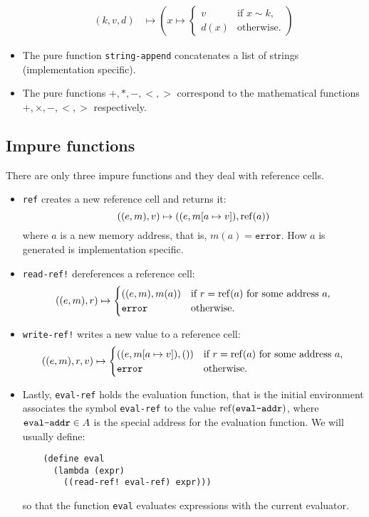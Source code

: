 \begin{itemize}
\begin{align*}
    (k, v, d) &\mapsto \left(x \mapsto
                \begin{cases}
                  v & \text{if $x \sim k$,}\\
                  d(x) & \text{otherwise.}
                \end{cases}
                \right)
  \end{align*}
\item The pure function \texttt{string-append} concatenates a list of strings
  (implementation specific).
\item The pure functions $\mathtt{+}, \mathtt{*}, \mathtt{-}, \mathtt{<},
  \mathtt{>}$ correspond to the mathematical functions $+, \times, -, <, >$
  respectively.
\end{itemize}

\subsection{Impure functions}

There are only three impure functions and they deal with reference cells.
\begin{itemize}
\item \texttt{ref} creates a new reference cell and returns it:
  \[
    ((e,m), v) \mapsto ((e,m[a \mapsto v]), \mathrm{ref}(a))
  \]
  where $a$ is a new memory address, that is, $m(a) = \mathtt{error}$. How $a$
  is generated is implementation specific.
\item \texttt{read-ref!} dereferences a reference cell:
  \[
    ((e,m), r) \mapsto
    \begin{cases}
      ((e,m), m(a)) & \text{if $r = \mathrm{ref}(a)$ for some address $a$,}\\
      \mathtt{error} & \text{otherwise.}
    \end{cases}
  \]
\item \texttt{write-ref!} writes a new value to a reference cell:
  \[
    ((e,m), r, v) \mapsto
    \begin{cases}
      ((e,m[a \mapsto v]), ()) & \text{if $r = \mathrm{ref}(a)$ for some address $a$,}\\
      \mathtt{error} & \text{otherwise.}
    \end{cases}
  \]
\item Lastly, \texttt{eval-ref} holds the evaluation function, that is the
  initial environment associates the symbol \texttt{eval-ref} to the value
  $\mathrm{ref}(\text{\texttt{eval-addr}})$, where $\text{\texttt{eval-addr}} \in A$ is the special address for the
  evaluation function. We will usually define:
  \begin{lstlisting}
    (define eval
      (lambda (expr)
        ((read-ref! eval-ref) expr)))
  \end{lstlisting}
  so that the function \texttt{eval} evaluates expressions with the current evaluator.
\end{itemize}
